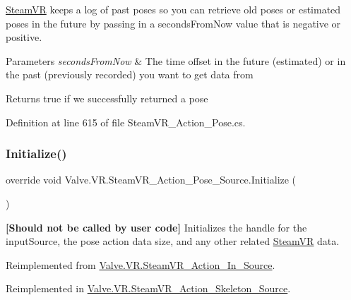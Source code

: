 \mbox{\hyperlink{class_valve_1_1_v_r_1_1_steam_v_r}{Steam\+VR}} keeps a log of past poses so you can retrieve old poses or estimated poses in the future by passing in a seconds\+From\+Now value that is negative or positive. 


\begin{DoxyParams}{Parameters}
{\em seconds\+From\+Now} & The time offset in the future (estimated) or in the past (previously recorded) you want to get data from\\
\hline
\end{DoxyParams}
\begin{DoxyReturn}{Returns}
true if we successfully returned a pose
\end{DoxyReturn}


Definition at line 615 of file Steam\+V\+R\+\_\+\+Action\+\_\+\+Pose.\+cs.

\mbox{\label{class_valve_1_1_v_r_1_1_steam_v_r___action___pose___source_ab25a681f8310683a3c6695973041acc0}} 
\subsubsection{\texorpdfstring{Initialize()}{Initialize()}}
{\footnotesize\ttfamily override void Valve.\+V\+R.\+Steam\+V\+R\+\_\+\+Action\+\_\+\+Pose\+\_\+\+Source.\+Initialize (\begin{DoxyParamCaption}{ }\end{DoxyParamCaption})\hspace{0.3cm}{\ttfamily [virtual]}}



{\bfseries{\mbox{[}Should not be called by user code\mbox{]}}} Initializes the handle for the input\+Source, the pose action data size, and any other related \mbox{\hyperlink{class_valve_1_1_v_r_1_1_steam_v_r}{Steam\+VR}} data. 



Reimplemented from \mbox{\hyperlink{class_valve_1_1_v_r_1_1_steam_v_r___action___in___source_a15f00851d0666c0f9f1836bf481f4f70}{Valve.\+V\+R.\+Steam\+V\+R\+\_\+\+Action\+\_\+\+In\+\_\+\+Source}}.



Reimplemented in \mbox{\hyperlink{class_valve_1_1_v_r_1_1_steam_v_r___action___skeleton___source_af437a90257ecb494eb2c0b77747fe9d4}{Valve.\+V\+R.\+Steam\+V\+R\+\_\+\+Action\+\_\+\+Skeleton\+\_\+\+Source}}.



